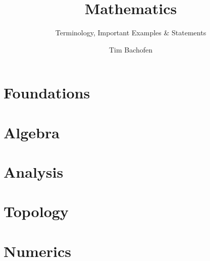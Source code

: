 


   \title{Mathematics}
   \subtitle{Terminology, Important Examples \& Statements}
   \author{Tim Bachofen}

   \maketitle

   \tableofcontents
   \newpage

   \part{Foundations}
   

   \newpage

   \part{Algebra}
   

   \newpage

   \part{Analysis}
   

   \newpage

   \part{Topology}
   

   \newpage

   \part{Numerics}
   

   \newpage

   \printglossaries{}

